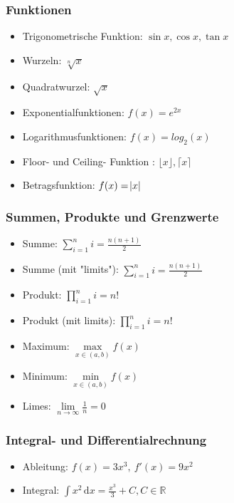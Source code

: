 \documentclass{scrartcl} %
\newcommand{\floor}[1]{\lfloor #1 \rfloor}
\newcommand{\ceil}[1]{\lceil #1 \rceil}
\begin{document}
\begin{multicols*}{3}
					\subsubsection{Funktionen}
    					\begin{itemize}
                            \item Trigonometrische Funktion: $ \sin{x}, \cos{x}, \tan{x}$
                            \item Wurzeln: $\sqrt[n]{x}$
                            \item Quadratwurzel: $\sqrt{x}$
                            \item Exponentialfunktionen: $f(x) = e^{2x}$
                            \item Logarithmusfunktionen: $f(x) = log_2(x)$
                            \item Floor- und Ceiling- Funktion : $\floor{x}, \ceil{x}$
                            \item Betragsfunktion: $f(x) = \abs{x}$
    					\end{itemize}
    					
    				\subsubsection{Summen, Produkte und Grenzwerte}
    				    \begin{itemize}
    				        \item Summe: $\sum_{i=1}^n i = \frac{n(n+1)}{2}$
    						\item Summe (mit "limits"): $\sum \limits_{i=1}^n i = \frac{n(n+1)}{2}$
    						\item Produkt: $\prod_{i=1}^n i = n!$
    						\item Produkt (mit limits): $\prod\limits_{i=1}^n i = n!$
    						\item Maximum: $\max\limits_{x \in (a,b)}f(x)$
    						\item Minimum: $\min\limits_{x \in (a,b)}f(x)$
    						\item Limes: $\lim\limits_{n \to \infty}\frac{1}{n}=0$ 
    				    \end{itemize}
    			    \subsubsection{Integral- und Differentialrechnung}
					    \begin{itemize}
					        \item Ableitung: $f(x) = 3x^3, \ f'(x) = 9x^2$
					        \item Integral: $\int x^2 \,\mathrm{d} x = \frac{x^3}{3} + C, C \in \mathbb{R}$
					        

\end{itemize}
\end{multicols*}
\end{document}
